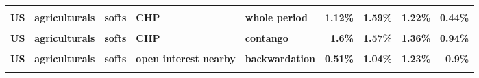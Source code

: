 \documentclass[
  authoryear,
  preprint,
  3p]{elsarticle}
\begin{document}
\begin{landscape}
\begin{longtable}[t]{>{}l>{}l>{}l>{}l>{}l>{}r>{}r>{}r>{}r}
\textbf{\cellcolor{gray!10}{US}} & \textbf{\cellcolor{gray!10}{agriculturals}} & \textbf{\cellcolor{gray!10}{softs}} & \textbf{\cellcolor{gray!10}{market}} & \textbf{\cellcolor{gray!10}{contango}} & \textcolor[HTML]{4285f4}{\textbf{\cellcolor{gray!10}{3.87\%}}} & \textcolor[HTML]{4285f4}{\textbf{\cellcolor{gray!10}{9.02\%}}} & \textcolor[HTML]{4285f4}{\textbf{\cellcolor{gray!10}{21.64\%}}} & \textcolor[HTML]{4285f4}{\textbf{\cellcolor{gray!10}{8.6\%}}}\\
\textbf{US} & \textbf{agriculturals} & \textbf{softs} & \textbf{CHP} & \textbf{whole period} & \textcolor[HTML]{4285f4}{\textbf{1.12\%}} & \textcolor[HTML]{4285f4}{\textbf{1.59\%}} & \textcolor[HTML]{4285f4}{\textbf{1.22\%}} & \textcolor[HTML]{4285f4}{\textbf{0.44\%}}\\
\textbf{\cellcolor{gray!10}{US}} & \textbf{\cellcolor{gray!10}{agriculturals}} & \textbf{\cellcolor{gray!10}{softs}} & \textbf{\cellcolor{gray!10}{CHP}} & \textbf{\cellcolor{gray!10}{backwardation}} & \textcolor[HTML]{4285f4}{\textbf{\cellcolor{gray!10}{1.11\%}}} & \textcolor[HTML]{4285f4}{\textbf{\cellcolor{gray!10}{2.07\%}}} & \textcolor[HTML]{4285f4}{\textbf{\cellcolor{gray!10}{1.49\%}}} & \textcolor[HTML]{4285f4}{\textbf{\cellcolor{gray!10}{1.35\%}}}\\
\addlinespace
\textbf{US} & \textbf{agriculturals} & \textbf{softs} & \textbf{CHP} & \textbf{contango} & \textcolor[HTML]{4285f4}{\textbf{1.6\%}} & \textcolor[HTML]{4285f4}{\textbf{1.57\%}} & \textcolor[HTML]{4285f4}{\textbf{1.36\%}} & \textcolor[HTML]{4285f4}{\textbf{0.94\%}}\\
\textbf{\cellcolor{gray!10}{US}} & \textbf{\cellcolor{gray!10}{agriculturals}} & \textbf{\cellcolor{gray!10}{softs}} & \textbf{\cellcolor{gray!10}{open interest nearby}} & \textbf{\cellcolor{gray!10}{whole period}} & \textcolor[HTML]{4285f4}{\textbf{\cellcolor{gray!10}{0.29\%}}} & \textcolor[HTML]{4285f4}{\textbf{\cellcolor{gray!10}{0.28\%}}} & \textcolor[HTML]{4285f4}{\textbf{\cellcolor{gray!10}{0.36\%}}} & \textcolor[HTML]{4285f4}{\textbf{\cellcolor{gray!10}{0.28\%}}}\\
\textbf{US} & \textbf{agriculturals} & \textbf{softs} & \textbf{open interest nearby} & \textbf{backwardation} & \textcolor[HTML]{4285f4}{\textbf{0.51\%}} & \textcolor[HTML]{4285f4}{\textbf{1.04\%}} & \textcolor[HTML]{4285f4}{\textbf{1.23\%}} & \textcolor[HTML]{4285f4}{\textbf{0.9\%}}\\
\textbf{\cellcolor{gray!10}{US}} & \textbf{\cellcolor{gray!10}{agriculturals}} & \textbf{\cellcolor{gray!10}{softs}} & \textbf{\cellcolor{gray!10}{open interest nearby}} & \textbf{\cellcolor{gray!10}{contango}} & \textcolor[HTML]{4285f4}{\textbf{\cellcolor{gray!10}{0.4\%}}} & \textcolor[HTML]{4285f4}{\textbf{\cellcolor{gray!10}{0.35\%}}} & \textcolor[HTML]{4285f4}{\textbf{\cellcolor{gray!10}{0.66\%}}} & \textcolor[HTML]{4285f4}{\textbf{\cellcolor{gray!10}{0.3\%}}}\\

\end{longtable}
\end{landscape}
\end{document}
